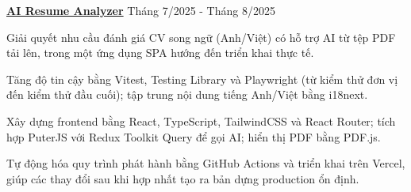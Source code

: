 \begin{cventries}
  \cvsimpleentry
    {\href{https://github.com/lopica/ai-resume-analyser}{\textbf{AI Resume Analyzer}}}
    {Tháng 7/2025 - Tháng 8/2025}
    {
      \begin{cvitems}
        \item {Giải quyết nhu cầu đánh giá CV song ngữ (Anh/Việt) có hỗ trợ AI từ tệp PDF tải lên, trong một ứng dụng SPA hướng đến triển khai thực tế.}
        \item {Tăng độ tin cậy bằng Vitest, Testing Library và Playwright (từ kiểm thử đơn vị đến kiểm thử đầu cuối); tập trung nội dung tiếng Anh/Việt bằng i18next.}
        \item {Xây dựng frontend bằng React, TypeScript, TailwindCSS và React Router; tích hợp PuterJS với Redux Toolkit Query để gọi AI; hiển thị PDF bằng PDF.js.}
        \item {Tự động hóa quy trình phát hành bằng GitHub Actions và triển khai trên Vercel, giúp các thay đổi sau khi hợp nhất tạo ra bản dựng production ổn định.}
      \end{cvitems}
    }
\end{cventries}
